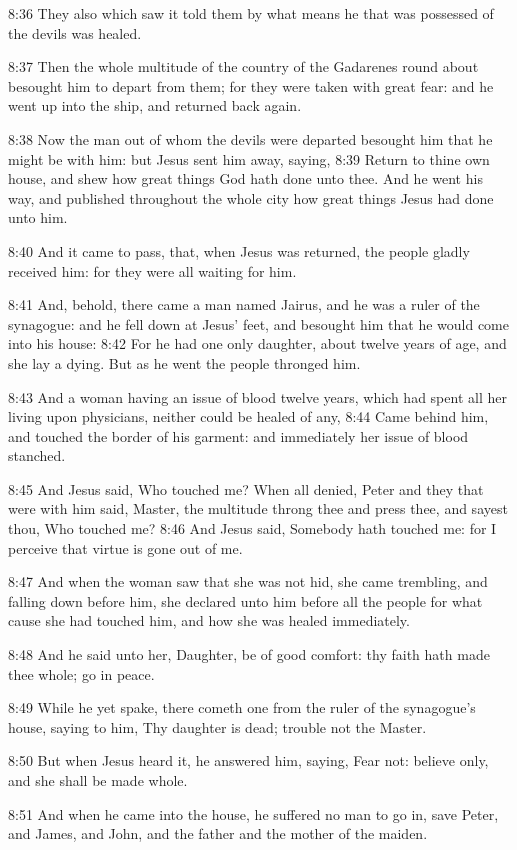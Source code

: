 8:36 They also which saw it told them by what means he that was possessed of the devils was healed.

8:37 Then the whole multitude of the country of the Gadarenes round about besought him to depart from them; for they were taken with great fear: and he went up into the ship, and returned back again.

8:38 Now the man out of whom the devils were departed besought him that he might be with him: but Jesus sent him away, saying, 8:39 Return to thine own house, and shew how great things God hath done unto thee. And he went his way, and published throughout the whole city how great things Jesus had done unto him.

8:40 And it came to pass, that, when Jesus was returned, the people gladly received him: for they were all waiting for him.

8:41 And, behold, there came a man named Jairus, and he was a ruler of the synagogue: and he fell down at Jesus' feet, and besought him that he would come into his house: 8:42 For he had one only daughter, about twelve years of age, and she lay a dying. But as he went the people thronged him.

8:43 And a woman having an issue of blood twelve years, which had spent all her living upon physicians, neither could be healed of any, 8:44 Came behind him, and touched the border of his garment: and immediately her issue of blood stanched.

8:45 And Jesus said, Who touched me? When all denied, Peter and they that were with him said, Master, the multitude throng thee and press thee, and sayest thou, Who touched me?  8:46 And Jesus said, Somebody hath touched me: for I perceive that virtue is gone out of me.

8:47 And when the woman saw that she was not hid, she came trembling, and falling down before him, she declared unto him before all the people for what cause she had touched him, and how she was healed immediately.

8:48 And he said unto her, Daughter, be of good comfort: thy faith hath made thee whole; go in peace.

8:49 While he yet spake, there cometh one from the ruler of the synagogue's house, saying to him, Thy daughter is dead; trouble not the Master.

8:50 But when Jesus heard it, he answered him, saying, Fear not: believe only, and she shall be made whole.

8:51 And when he came into the house, he suffered no man to go in, save Peter, and James, and John, and the father and the mother of the maiden.

